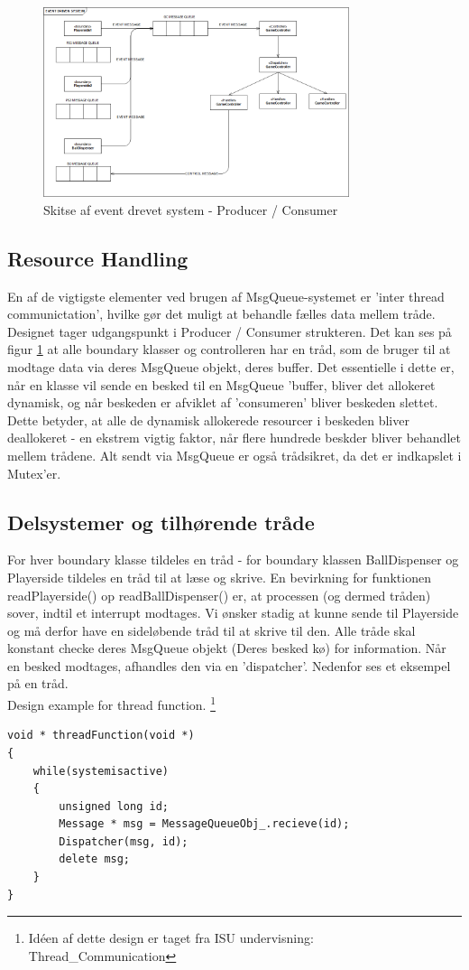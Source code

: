 \documentclass[Softwaredesign/Softwaredesign_main.tex]{subfiles}
\begin{document}
\begin{figure}[H]
    \centering
    \includegraphics[width=0.8\textwidth]{Softwaredesign/RPiApp/graphic_RPi/EDS.png}
    \caption{Skitse af event drevet system - Producer / Consumer}
    \label{fig:EDS}
\end{figure}
\subsection{Resource Handling}
En af de vigtigste elementer ved brugen af MsgQueue-systemet er 'inter thread communictation', hvilke gør det muligt at behandle fælles data mellem tråde. Designet tager udgangspunkt i Producer / Consumer strukteren. Det kan ses på figur \ref{fig:EDS} at alle boundary klasser og controlleren har en tråd, som de bruger til at modtage data via deres MsgQueue objekt, deres buffer. Det essentielle i dette er, når en klasse vil sende en besked til en MsgQueue 'buffer, bliver det allokeret dynamisk, og når beskeden er afviklet af 'consumeren' bliver beskeden slettet. Dette betyder, at alle de dynamisk allokerede resourcer i beskeden bliver deallokeret - en ekstrem vigtig faktor, når flere hundrede beskder bliver behandlet mellem trådene. Alt sendt via MsgQueue er også trådsikret, da det er indkapslet i Mutex'er. 
\subsection{Delsystemer og tilhørende tråde}
For hver boundary klasse tildeles en tråd - for boundary klassen BallDispenser og Playerside tildeles en tråd til at læse og skrive. En bevirkning for funktionen readPlayerside() op readBallDispenser() er, at processen (og dermed tråden) sover, indtil et interrupt modtages.  
Vi ønsker stadig at kunne sende til Playerside og må derfor have en sideløbende tråd til at skrive til den. Alle tråde skal konstant checke deres MsgQueue objekt (Deres besked kø) for information. Når en besked modtages, afhandles den via en 'dispatcher'. Nedenfor ses et eksempel på en tråd.
\\Design example for thread function. \footnote{Idéen af dette design er taget fra ISU undervisning: Thread\_Communication}
\begin{lstlisting}[caption={Design af trådfunktion},label={lst:threadfuc}]
void * threadFunction(void *)
{
    while(systemisactive)
    {
        unsigned long id;
        Message * msg = MessageQueueObj_.recieve(id);
        Dispatcher(msg, id);
        delete msg; 
    }
}
\end{lstlisting}
\end{document}
